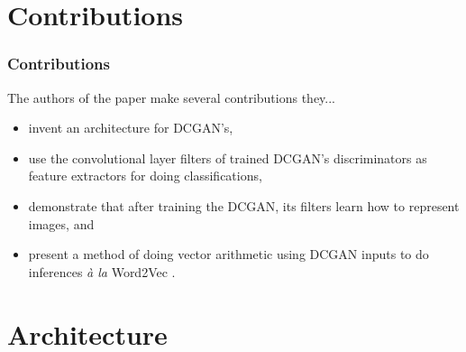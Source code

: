 \documentclass{beamer}
\begin{document}

\section{Contributions}
\begin{frame}[allowframebreaks]
\frametitle{Contributions}

The authors of the paper make several contributions they...
\begin{itemize}
  \item invent an architecture for DCGAN's,
  \item use the convolutional layer filters of trained DCGAN's discriminators as 
    feature extractors for doing classifications,
  \item demonstrate that after training the DCGAN, its filters learn how to
    represent images, and
  \item present a method of doing vector arithmetic using DCGAN inputs to do 
    inferences \emph{{\`a} la} Word2Vec \cite{word2Vec}.
\end{itemize}
\end{frame}

\section{Architecture}
\end{document}
